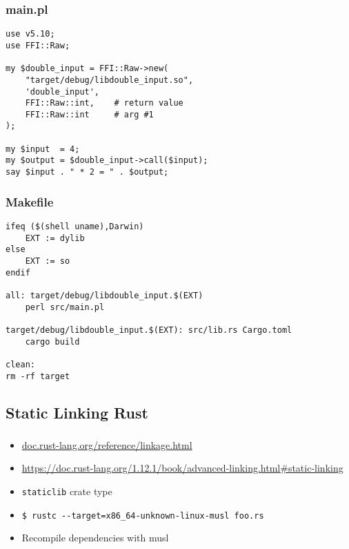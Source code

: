 \documentclass{beamer}
\begin{document}
\begin{frame}[fragile]
\frametitle{main.pl}
\begin{verbatim}
use v5.10;
use FFI::Raw;

my $double_input = FFI::Raw->new(
    "target/debug/libdouble_input.so",
    'double_input',
    FFI::Raw::int,    # return value
    FFI::Raw::int     # arg #1
);

my $input  = 4;
my $output = $double_input->call($input);
say $input . " * 2 = " . $output;
\end{verbatim}
\end{frame}

\begin{frame}[fragile]
\frametitle{Makefile}
\begin{verbatim}
ifeq ($(shell uname),Darwin)
    EXT := dylib
else
    EXT := so
endif

all: target/debug/libdouble_input.$(EXT)
    perl src/main.pl

target/debug/libdouble_input.$(EXT): src/lib.rs Cargo.toml
    cargo build

clean:
rm -rf target
\end{verbatim}
\end{frame}


\subsection{Static Linking Rust}

\begin{frame}[fragile]
\tableofcontents[currentsubsection]
\end{frame}


\begin{frame}[fragile]
\frametitle{\insertsubsectionhead}

\begin{itemize}[<+(1)->]
\item \url{doc.rust-lang.org/reference/linkage.html}
\item \url{https://doc.rust-lang.org/1.12.1/book/advanced-linking.html#static-linking}
\item \verb|staticlib| crate type
\item \verb|$ rustc --target=x86_64-unknown-linux-musl foo.rs|
\item Recompile dependencies with musl
\end{itemize}

\end{frame}
\end{document}
